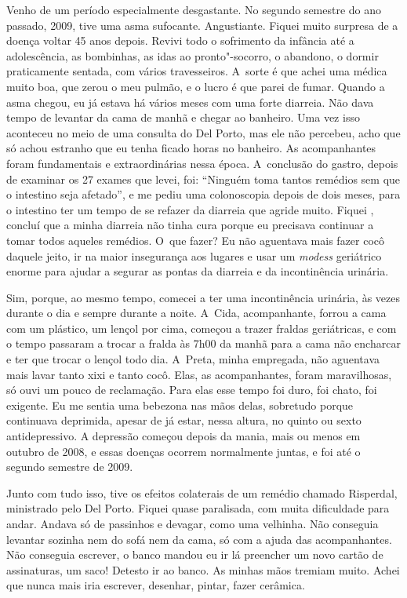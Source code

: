 Venho de um período especialmente desgastante. No segundo semestre do
ano passado, 2009, tive uma asma sufocante. Angustiante. Fiquei muito
surpresa de a doença voltar 45 anos depois. Revivi todo o sofrimento da
infância até a adolescência, as bombinhas, as idas ao pronto"-socorro, o
abandono, o dormir praticamente sentada, com vários travesseiros. A~sorte é que achei uma médica muito boa, que zerou o meu pulmão, e o
lucro é que parei de fumar. Quando a asma chegou, eu já estava há vários
meses com uma forte diarreia. Não dava tempo de levantar da cama de
manhã e chegar ao banheiro. Uma vez isso aconteceu no meio de uma
consulta do Del Porto, mas ele não percebeu, acho que só achou estranho
que eu tenha ficado horas no banheiro. As acompanhantes foram
fundamentais e extraordinárias nessa época. A~conclusão do gastro,
depois de examinar os 27 exames que levei, foi: ``Ninguém toma tantos
remédios sem que o intestino seja afetado'', e me pediu uma colonoscopia
depois de dois meses, para o intestino ter um tempo de se refazer da
diarreia que agride muito. Fiquei , concluí que a minha diarreia
não tinha cura porque eu precisava continuar a tomar todos aqueles
remédios. O~que fazer? Eu não aguentava mais fazer cocô daquele jeito,
ir na maior insegurança aos lugares e usar um \emph{modess} geriátrico
enorme para ajudar a segurar as pontas da diarreia e da incontinência
urinária.

Sim, porque, ao mesmo tempo, comecei a ter uma incontinência urinária,
às vezes durante o dia e sempre durante a noite. A~Cida, acompanhante,
forrou a cama com um plástico, um lençol por cima, começou a trazer
fraldas geriátricas, e com o tempo passaram a trocar a fralda às 7h00 da
manhã para a cama não encharcar e ter que trocar o lençol todo dia. A~Preta, minha empregada, não aguentava mais lavar tanto xixi e tanto
cocô. Elas, as acompanhantes, foram maravilhosas, só ouvi um pouco de
reclamação. Para elas esse tempo foi duro, foi chato, foi exigente. Eu
me sentia uma bebezona nas mãos delas, sobretudo porque continuava
deprimida, apesar de já estar, nessa altura, no quinto ou sexto
antidepressivo. A depressão começou depois da mania, mais ou menos em
outubro de 2008, e essas doenças ocorrem normalmente juntas, e foi até o
segundo semestre de 2009.

Junto com tudo isso, tive os efeitos colaterais de um remédio chamado
Risperdal, ministrado pelo Del Porto. Fiquei quase paralisada, com muita
dificuldade para andar. Andava só de passinhos e devagar, como uma
velhinha. Não conseguia levantar sozinha nem do sofá nem da cama, só com
a ajuda das acompanhantes. Não conseguia escrever, o banco mandou eu ir
lá preencher um novo cartão de assinaturas, um saco! Detesto ir ao
banco. As minhas mãos tremiam muito. Achei que nunca mais iria escrever,
desenhar, pintar, fazer cerâmica.

